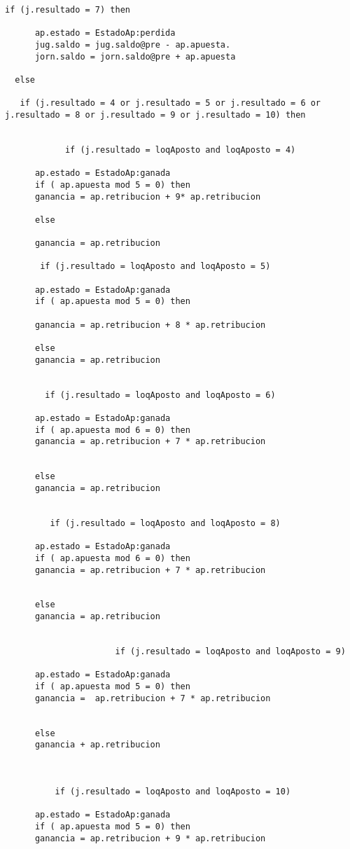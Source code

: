 \begin{framed}
\begin{lstlisting}[breaklines=true]
  if (j.resultado = 7) then

      ap.estado = EstadoAp:perdida
      jug.saldo = jug.saldo@pre - ap.apuesta.
      jorn.saldo = jorn.saldo@pre + ap.apuesta

  else

   if (j.resultado = 4 or j.resultado = 5 or j.resultado = 6 or j.resultado = 8 or j.resultado = 9 or j.resultado = 10) then


            if (j.resultado = loqAposto and loqAposto = 4)

      ap.estado = EstadoAp:ganada
      if ( ap.apuesta mod 5 = 0) then
      ganancia = ap.retribucion + 9* ap.retribucion
      
      else
      
      ganancia = ap.retribucion 
      
       if (j.resultado = loqAposto and loqAposto = 5)

      ap.estado = EstadoAp:ganada
      if ( ap.apuesta mod 5 = 0) then
      
      ganancia = ap.retribucion + 8 * ap.retribucion
      
      else
      ganancia = ap.retribucion 
        

        if (j.resultado = loqAposto and loqAposto = 6)

      ap.estado = EstadoAp:ganada
      if ( ap.apuesta mod 6 = 0) then
      ganancia = ap.retribucion + 7 * ap.retribucion
      
      
      else
      ganancia = ap.retribucion 
      

         if (j.resultado = loqAposto and loqAposto = 8)

      ap.estado = EstadoAp:ganada
      if ( ap.apuesta mod 6 = 0) then
      ganancia = ap.retribucion + 7 * ap.retribucion
      

      else
      ganancia = ap.retribucion 
      

                      if (j.resultado = loqAposto and loqAposto = 9)

      ap.estado = EstadoAp:ganada
      if ( ap.apuesta mod 5 = 0) then
      ganancia =  ap.retribucion + 7 * ap.retribucion
      

      else
      ganancia + ap.retribucion 
      


          if (j.resultado = loqAposto and loqAposto = 10)

      ap.estado = EstadoAp:ganada
      if ( ap.apuesta mod 5 = 0) then
      ganancia = ap.retribucion + 9 * ap.retribucion
      


\end{lstlisting}
\end{framed}
